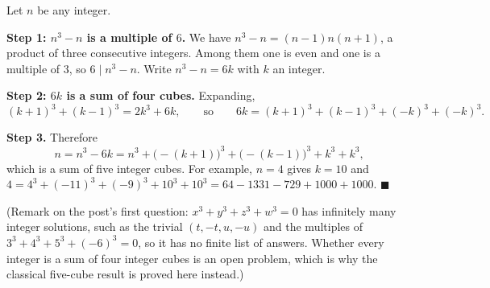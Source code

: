 Let $n$ be any integer.

\textbf{Step 1: $n^3-n$ is a multiple of $6$.} We have $n^3-n=(n-1)n(n+1)$, a product of three consecutive integers. Among them one is even and one is a multiple of $3$, so $6\mid n^3-n$. Write $n^3-n=6k$ with $k$ an integer.

\textbf{Step 2: $6k$ is a sum of four cubes.} Expanding,
\[
(k+1)^3+(k-1)^3=2k^3+6k,\qquad\text{so}\qquad 6k=(k+1)^3+(k-1)^3+(-k)^3+(-k)^3 .
\]

\textbf{Step 3.} Therefore
\[
n=n^3-6k=n^3+\bigl(-(k+1)\bigr)^3+\bigl(-(k-1)\bigr)^3+k^3+k^3,
\]
which is a sum of five integer cubes. For example, $n=4$ gives $k=10$ and $4=4^3+(-11)^3+(-9)^3+10^3+10^3=64-1331-729+1000+1000$. $\blacksquare$

(Remark on the post's first question: $x^3+y^3+z^3+w^3=0$ has infinitely many integer solutions, such as the trivial $(t,-t,u,-u)$ and the multiples of $3^3+4^3+5^3+(-6)^3=0$, so it has no finite list of answers. Whether every integer is a sum of four integer cubes is an open problem, which is why the classical five-cube result is proved here instead.)

